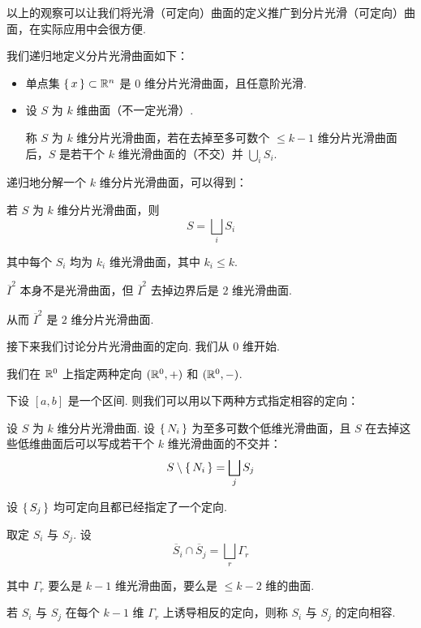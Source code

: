 以上的观察可以让我们将光滑（可定向）曲面的定义推广到分片光滑（可定向）曲面，在实际应用中会很方便.

\begin{definition}
    我们递归地定义分片光滑曲面如下：

    \begin{itemize}
        \item 单点集 $\set{x}\subset\mathbb{R}^n$ 是 $0$ 维分片光滑曲面，且任意阶光滑.
        
        \item 设 $S$ 为 $k$ 维曲面（不一定光滑）.
        
        称 $S$ 为 $k$ 维分片光滑曲面，若在去掉至多可数个 $\le k-1$ 维分片光滑曲面后，$S$ 是若干个 $k$ 维光滑曲面的（不交）并 $\bigcup_i S_i$.
    \end{itemize}
\end{definition}

\begin{hint}
    递归地分解一个 $k$ 维分片光滑曲面，可以得到：
    
    若 $S$ 为 $k$ 维分片光滑曲面，则
$$
S=\bigsqcup_iS_i
$$

    其中每个 $S_i$ 均为 $k_i$ 维光滑曲面，其中 $k_i\le k$.
\end{hint}

\begin{example}
    $\overline{I}^2$ 本身不是光滑曲面，但 $\overline{I}^2$ 去掉边界后是 $2$ 维光滑曲面.

    从而 $\overline{I}^2$ 是 $2$ 维分片光滑曲面.
\end{example}

接下来我们讨论分片光滑曲面的定向. 我们从 $0$ 维开始.

我们在 $\mathbb{R}^0$ 上指定两种定向 $(\mathbb{R}^0,+)$ 和 $(\mathbb{R}^0,-)$.

下设 $[a,b]$ 是一个区间. 则我们可以用以下两种方式指定相容的定向：


设 $S$ 为 $k$ 维分片光滑曲面. 设 $\set{N_i}$ 为至多可数个低维光滑曲面，且 $S$ 在去掉这些低维曲面后可以写成若干个 $k$ 维光滑曲面的不交并：
$$
S\setminus\set{N_i}=\bigsqcup_jS_j
$$

设 $\set{S_j}$ 均可定向且都已经指定了一个定向.

取定 $S_i$ 与 $S_j$. 设
$$
\overline{S}_i\cap\overline{S}_j=\bigsqcup_r\Gamma_r
$$

其中 $\Gamma_r$ 要么是 $k-1$ 维光滑曲面，要么是 $\le k-2$ 维的曲面.

若 $S_i$ 与 $S_j$ 在每个 $k-1$ 维 $\Gamma_r$ 上诱导相反的定向，则称 $S_i$ 与 $S_j$ 的定向相容.

